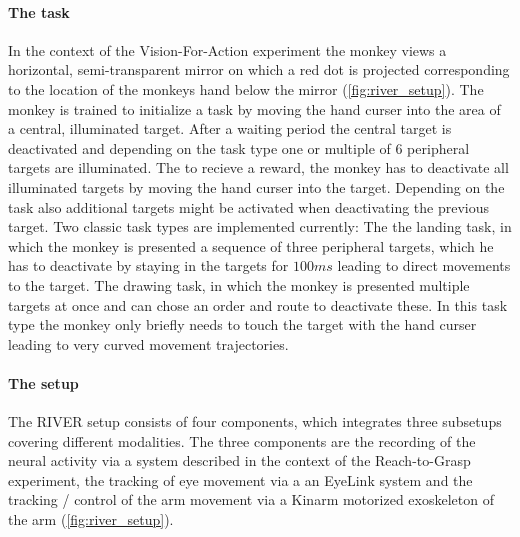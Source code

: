 \paragraph{The task}
In the context of the Vision-For-Action experiment the monkey views a horizontal, semi-transparent mirror on which a red dot is projected corresponding to the location of the monkeys hand below the mirror (\cref{fig:river_setup}). The monkey is trained to initialize a task by moving the hand curser into the area of a central, illuminated target. After a waiting period the central target is deactivated and depending on the task type one or multiple of 6 peripheral targets are illuminated. The to recieve a reward, the monkey has to deactivate all illuminated targets by moving the hand curser into the target. Depending on the task also additional targets might be activated when deactivating the previous target. Two classic task types are implemented currently: The the landing task, in which the monkey is presented a sequence of three peripheral targets, which he has to deactivate by staying in the targets for $100ms$ leading to direct movements to the target. The drawing task, in which the monkey is presented multiple targets at once and can chose an order and route to deactivate these. In this task type the monkey only briefly needs to touch the target with the hand curser leading to very curved movement trajectories. 


\paragraph{The setup}
The RIVER setup consists of four components, which integrates three subsetups covering different modalities. The three components are the recording of the neural activity via a  system described in the context of the Reach-to-Grasp experiment, the tracking of eye movement via a an EyeLink system and the tracking / control of the arm movement via a Kinarm motorized exoskeleton of the arm (\cref{fig:river_setup}).

